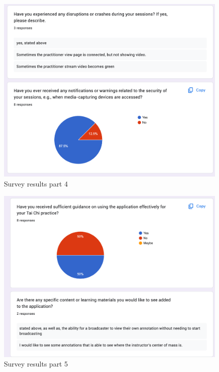 \documentclass[12pt, titlepage]{article}
\begin{document}
\begin{figure}[h]
  \centering
  \includegraphics[width=1.0\linewidth]{surveyp4.png}
  \caption{Survey results part 4}
  \label{fig:surveyp4}
\end{figure}

\begin{figure}[h]
  \centering
  \includegraphics[width=1.0\linewidth]{surveyp5.png}
  \caption{Survey results part 5}
  \label{fig:surveyp5}
\end{figure}
\end{document}
